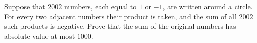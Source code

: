 Suppose that $2002$ numbers, each equal to $1$ or $-1$, are written around a circle. For every two adjacent numbers their product is taken, and the sum of all $2002$ such products is negative. Prove that the sum of the original numbers has absolute value at most $1000$.
